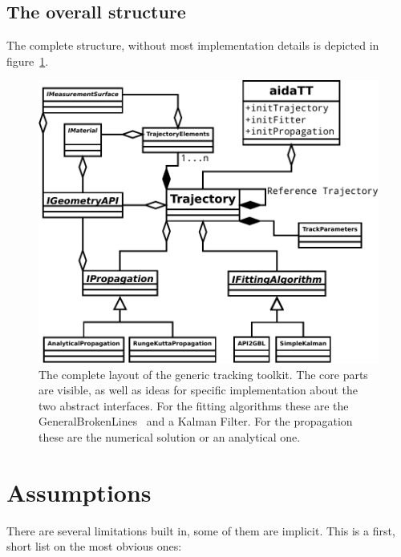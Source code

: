 \documentclass[12pt]{article}
\begin{document}
\subsection{The overall structure}
The complete structure, without most implementation details is depicted in figure~\ref{fig:total}.
 \begin{figure}[h!]
 \begin{center}
 \includegraphics[width=\linewidth]{overall.pdf}
 \end{center}
 \caption{The complete layout of the generic tracking toolkit.
 The core parts are visible, as well as ideas for specific implementation about the two abstract interfaces.
 For the fitting algorithms these are the GeneralBrokenLines~\cite{GBL} and a Kalman Filter.
 For the propagation these are the numerical solution or an analytical one.}
 \label{fig:total}
 \end{figure}
 
\newpage



\section{Assumptions}
There are several limitations built in, some of them are implicit.
This is a first, short list on the most obvious ones:
\end{document}
